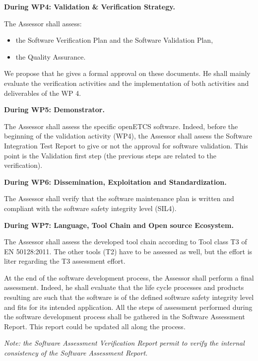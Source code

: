 \textbf{
During WP4: Validation \& Verification Strategy.
}

The Assessor shall assess:
\begin{itemize}\itemsep=0pt
  \item the Software Verification Plan and the Software Validation Plan,
  \item the Quality Assurance.
 \end{itemize}
We propose that he gives a formal approval on these documents. 
He shall mainly evaluate the verification activities and the implementation of both activities and deliverables of the WP 4.


\textbf{
During WP5: Demonstrator.
}

The Assessor shall assess the specific openETCS software.
Indeed, before the beginning of the validation activity (WP4), the Assessor shall assess the Software Integration Test Report to give or not the approval for software validation. This point is the Validation first step (the previous steps are related to the verification).


\textbf{
During WP6: Dissemination, Exploitation and Standardization.
}

The Assessor shall verify that the software maintenance plan is written and compliant with the software safety integrity level (SIL4).

\textbf{
During WP7: Language, Tool Chain and Open source Ecosystem.
}

The Assessor shall assess the developed tool chain according to Tool class T3 of EN 50128:2011. The other tools (T2) have to be assessed as well, but the effort is liter regarding the T3 assessment effort.

At the end of the software development process, the Assessor shall perform a final assessment. Indeed, he shall evaluate that the life cycle processes and products resulting are such that the software is of the defined software safety integrity level and fits for its intended application. All the steps of assessment performed during the software development process shall be gathered in the Software Assessment Report. This report could be updated all along the process.

{\itshape
Note: the Software Assessment Verification Report permit to verify the internal consistency of the Software Assessment Report.
}


